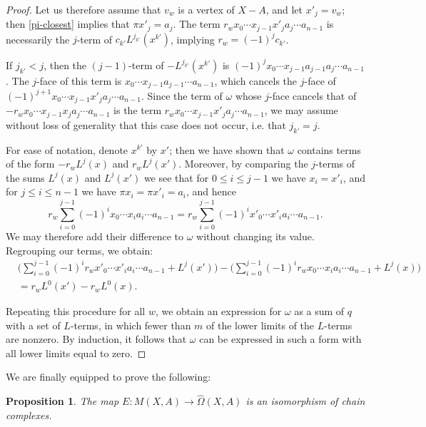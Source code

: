 \documentclass[11pt]{article}
\newtheorem{proposition}[theo]{Proposition}
\theoremstyle{definition}
\numberwithin{equation}{section}
\newcommand{\tOmega}{\widehat{\Omega}}
\begin{document}
\begin{proof}
Let us therefore assume that $v_w$ is a vertex of $X-A$, and let $x'_j = v_w$; then \cref{pi-closest} implies that $\pi x'_j = a_j$. The term $r_w x_0 \cdots x_{j-1} x'_j a_{j} \cdots a_{n-1}$ is necessarily the $j$-term of $c_{k'}L^{j_{k'}}(x^{k'})$, implying $r_w = (-1)^j c_{k'}$. 

If $j_{k'} < j$, then the $(j-1)$-term of $-L^{j_{k'}}(x^{k'})$ is $(-1)^{j}x_0 \cdots x_{j-1} a_{j-1} a_{j} \cdots a_{n-1}$. The $j$-face of this term is $x_0 \cdots x_{j-1} a_{j-1} \cdots a_{n-1}$, which cancels the $j$-face of $(-1)^{j+1}x_0 \cdots x_{j-1} x'_j a_{j} \cdots a_{n-1}$. Since the term of $\omega$ whose $j$-face cancels that of $-r_w x_0 \cdots x_{j-1} x_j a_{j} \cdots a_{n-1}$ is the term $r_w x_0 \cdots x_{j-1} x'_j a_{j} \cdots a_{n-1}$, we may assume without loss of generality that this case does not occur, i.e.  that $j_{k'} = j$.

For ease of notation, denote $x^{k'}$ by $x'$; then we have shown that $\omega$ contains terms of the form $-r_w L^j(x)$ and $r_w L^j(x')$. Moreover, by comparing the $j$-terms of the sums $L^j(x)$ and $L^j(x')$ we see that for $0 \leq i \leq j-1$ we have $x_i = x'_i$, and for $j \leq i \leq n - 1$ we have $\pi x_i = \pi x'_i = a_i$, and hence
\[r_w \sum\limits_{i=0}^{j-1} (-1)^i x_0 \cdots x_i a_i \cdots a_{n-1} = r_w \sum\limits_{i=0}^{j-1} (-1)^i x'_0 \cdots x'_i a_i \cdots a_{n-1}.\]
We may therefore add their difference to $\omega$ without changing its value. Regrouping our terms, we obtain:
\begin{align*}
& \Big(\sum\limits_{i=0}^{j-1} (-1)^i r_w x'_0 \cdots x'_i a_i \cdots a_{n-1} + L^j(x')\Big) - \Big(\sum\limits_{i=0}^{j-1} (-1)^i r_w x_0 \cdots x_i a_i \cdots a_{n-1} + L^j(x)\Big) \\
&= r_w L^0(x') - r_w L^0(x).
\end{align*}

Repeating this procedure for all $w$, we obtain an expression for $\omega$ as a sum of $q$ with a set of $L$-terms, in which fewer than $m$ of the lower limits of the $L$-terms are nonzero. By induction, it follows that $\omega$ can be expressed in such a form with all lower limits equal to zero.
\end{proof}
We are finally equipped to prove the following:
\begin{proposition}\label{cone-omega-iso}
The map $E \colon M(X,A) \to \tOmega(X,A)$ is an isomorphism of chain complexes.
\end{proposition}
\end{document}
